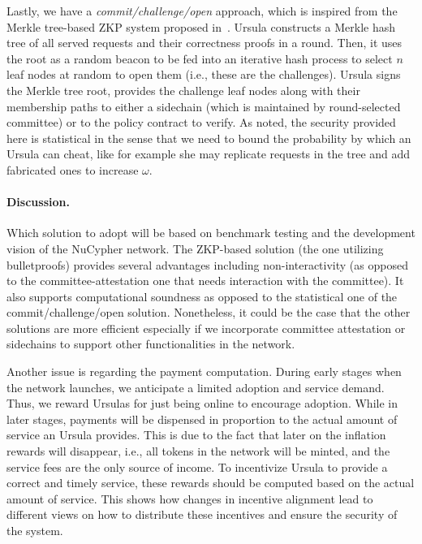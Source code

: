 \documentclass{llncs}
\begin{document}
Lastly, we have a \emph{commit/challenge/open} approach, which is inspired from the Merkle tree-based ZKP system proposed in~\cite{dottling19}. Ursula constructs a Merkle hash tree of all served requests and their correctness proofs in a round. Then, it uses the root as a random beacon to be fed into an iterative hash process to select $n$ leaf nodes at random to open them (i.e., these are the challenges). Ursula signs the Merkle tree root, provides the challenge leaf nodes along with their membership paths to either a sidechain (which is maintained by round-selected committee) or to the policy contract to verify. As noted, the security provided here is statistical in the sense that we need to bound the probability by which an Ursula can cheat, like for example she may replicate requests in the tree and add fabricated ones to increase $\omega$. 


\paragraph{Discussion.} Which solution to adopt will be based on benchmark testing and the development vision of the NuCypher network. The ZKP-based solution (the one utilizing bulletproofs) provides several advantages including non-interactivity (as opposed to the committee-attestation one that needs interaction with the committee). It also supports computational soundness as opposed to the statistical one of the commit/challenge/open solution. Nonetheless, it could be the case that the other solutions are more efficient especially if we incorporate committee attestation or sidechains to support other functionalities in the network. 


Another issue is regarding the payment computation. During early stages when the network launches, we anticipate a limited adoption and service demand. Thus, we reward Ursulas for just being online to encourage adoption. While in later stages, payments will be dispensed in proportion to the actual amount of service an Ursula provides. This is due to the fact that later on the inflation rewards will disappear, i.e., all tokens in the network will be minted, and the service fees are the only source of income. To incentivize Ursula to provide a correct and timely service, these rewards should be computed based on the actual amount of service. This shows how changes in incentive alignment lead to different views on how to distribute these incentives and ensure the security of the system.
\end{document}
